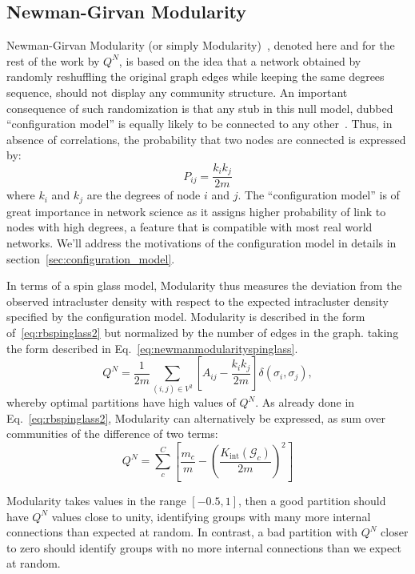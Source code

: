 \subsection{Newman-Girvan Modularity}\label{sec:newman_modularity}
Newman-Girvan Modularity (or simply Modularity)~\cite{newman2006}, denoted here and for the rest of the work by $Q^N$, is based on the idea that a network obtained by randomly reshuffling the original graph edges while keeping the same degrees sequence, should not display any community structure. 
An important consequence of such randomization is that any stub in this null model, dubbed ``configuration model'' is equally likely to be connected to any other~\cite{newman2010networks}. Thus, in absence of correlations, the probability that two nodes are connected is expressed by:
\begin{equation}\label{eq:configuration_model}
P_{ij} = \frac{k_i k_j}{2m}
\end{equation}
where $k_i$ and $k_j$ are the degrees of node $i$ and $j$. The ``configuration model''  is of great importance in network science as it assigns higher probability of link to nodes with high degrees, a feature that is compatible with most real world networks. 
We'll address the motivations of the configuration model in  details in section~\ref{sec:configuration_model}.

In terms of a spin glass model, Modularity thus measures the deviation from the observed intracluster density with respect to the expected intracluster density specified by the configuration model. Modularity is described in the form of~\ref{eq:rbspinglass2} but normalized by the number of edges in the graph. taking the form described in Eq.~\ref{eq:newmanmodularityspinglass}.
\begin{equation}\label{eq:newmanmodularityspinglass}
Q^N =  \frac{1}{2m} \sum_{ (i,j) \in V^2} \left[ A_{ij} - \frac{k_i k_j}{2m} \right] \delta(\sigma_i,\sigma_j),
\end{equation}
whereby optimal partitions have high values of $Q^N$. As already done in Eq.~\ref{eq:rbspinglass2}, Modularity can alternatively be expressed, as sum over communities of the difference of two terms:
\begin{equation}\label{eq:newmanmodularity}
Q^N = \sum_{c}^{C} \left[ \frac{m_c}{m} - \left( \frac{K_{\textrm{int}}(\mathcal{G}_c)}{2m} \right)^2 \right]
\end{equation}

Modularity takes values in the range $[-0.5,1]$, then a good partition should have $Q^N$ values close to unity, identifying groups with many more internal connections than expected at random. In contrast, a bad partition with $Q^N$ closer to zero should identify groups with no more internal connections than we expect at random.

